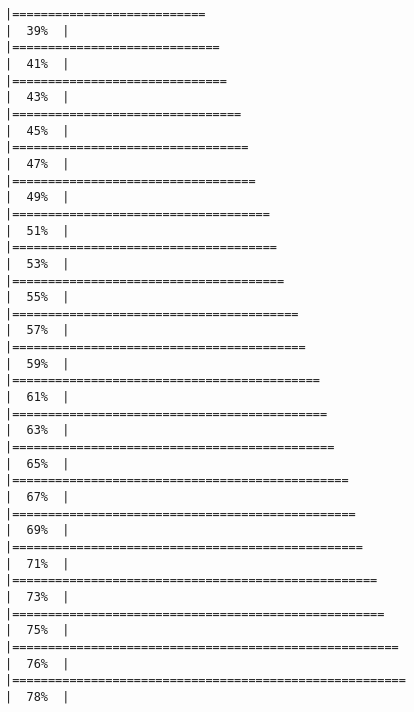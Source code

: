 \begin{verbatim}
|===========================                                           |  39%  |                                                                              |=============================                                         |  41%  |                                                                              |==============================                                        |  43%  |                                                                              |================================                                      |  45%  |                                                                              |=================================                                     |  47%  |                                                                              |==================================                                    |  49%  |                                                                              |====================================                                  |  51%  |                                                                              |=====================================                                 |  53%  |                                                                              |======================================                                |  55%  |                                                                              |========================================                              |  57%  |                                                                              |=========================================                             |  59%  |                                                                              |===========================================                           |  61%  |                                                                              |============================================                          |  63%  |                                                                              |=============================================                         |  65%  |                                                                              |===============================================                       |  67%  |                                                                              |================================================                      |  69%  |                                                                              |=================================================                     |  71%  |                                                                              |===================================================                   |  73%  |                                                                              |====================================================                  |  75%  |                                                                              |======================================================                |  76%  |                                                                              |=======================================================               |  78%  |                                                                              
\end{verbatim}
